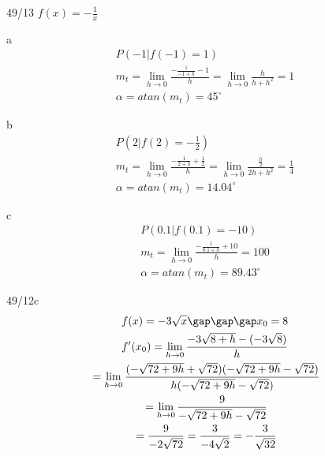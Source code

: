 \begin{exercise}{49/13}
  $f(x) = -\frac{1}{x}$
  \item [a]
  \begin{gather*}
    P(-1|f(-1) = 1) \\
    m_t = \lim\limits_{h \to 0} \frac{-\frac{1}{-1 + h} - 1}{h} = \lim\limits_{h \to 0} \frac{h}{h + h^2} = 1 \\
    \alpha = atan(m_t) = 45^\circ
  \end{gather*}
  \item [b]
  \begin{gather*}
    P(2|f(2) = -\frac{1}{2}) \\
    m_t = \lim\limits_{h \to 0} \frac{-\frac{1}{2 + h} + \frac{1}{2}}{h} = \lim\limits_{h \to 0} \frac{\frac{h}{2}}{2h + h^2} = \frac{1}{4} \\
    \alpha = atan(m_t) = 14.04^\circ
  \end{gather*}
  \item [c]
  \begin{gather*}
    P(0.1|f(0.1) = -10) \\
    m_t = \lim\limits_{h \to 0} \frac{-\frac{1}{0.1 + h} + 10}{h} = 100 \\
    \alpha = atan(m_t) = 89.43^\circ
  \end{gather*}
\end{exercise}
\begin{exercise}{49/12c}
  \begin{gather*}
    f(x) = -3\sqrt{x}\gap\gap\gap x_0 = 8 \\
    f'(x_0) = \lim\limits_{h \to 0} \frac{-3\sqrt{8 + h} - (-3\sqrt{8})}{h} \\
    \;= \lim\limits_{h \to 0} \frac{(-\sqrt{72 + 9h} + \sqrt{72})(-\sqrt{72 + 9h} - \sqrt{72})}{h(-\sqrt{72 + 9h} - \sqrt{72})} \\
    \;= \lim\limits_{h \to 0} \frac{9}{-\sqrt{72 + 9h} - \sqrt{72}} \\
    \;= \frac{9}{-2\sqrt{72}} = \frac{3}{-4\sqrt{2}} = -\frac{3}{\sqrt{32}}
  \end{gather*}
\end{exercise}
